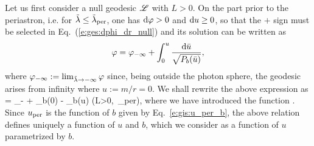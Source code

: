 Let us first consider a null geodesic $\mathscr{L}$ with $L>0$. On the part prior to
the periastron, i.e. for ${\tilde\lambda} \leq {\tilde\lambda}_{\rm per}$, one has
$\mathrm{d}\varphi > 0$ and $\mathrm{d} u \geq 0$, so that the $+$ sign must be selected in
Eq.~(\ref{e:ges:dphi_dr_null}) and its solution can be written as
\[
    \varphi = \varphi_{-\infty} + \int_0^u \frac{\mathrm{d}\bar{u}}{\sqrt{P_b(\bar{u})}} ,
\]
where $\varphi_{-\infty} := \lim_{{\tilde\lambda}\to-\infty} \varphi$ since, being outside
the photon sphere, the geodesic arises from infinity where $u := m/r = 0$.
We shall rewrite the above expression as
\be
    \ph = \ph_{-\infty} + \Phi_b(0) - \Phi_b(u) \qquad (L>0,\ \tlamb \leq \tlamb_{\rm per}),
\ee
where we have introduced the function
\be
    .
\ee
Since $u_{\rm per}$ is the function of $b$ given by Eq.~\eqref{e:gis:u_per_b},
the above relation defines uniquely a function of $u$ and $b$, which we consider
as a function of $u$ parametrized by $b$.

